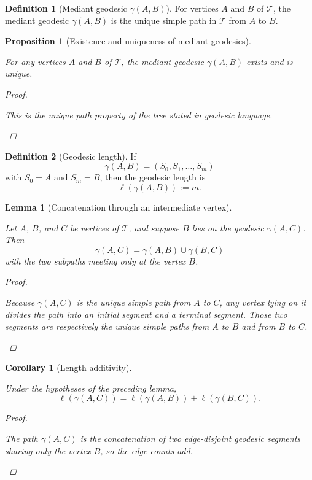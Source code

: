 \documentclass[11pt, letterpaper]{article}
\theoremstyle{definition}
\newtheorem{definition}{Definition}[section]
\theoremstyle{plain}
\newtheorem{lemma}{Lemma}[section]
\newtheorem{proposition}{Proposition}[section]
\newtheorem{corollary}{Corollary}[section]
\begin{document}
\begin{definition}[Mediant geodesic $\gamma(A,B)$]
For vertices $A$ and $B$ of $\mathcal{T}$, the mediant geodesic $\gamma(A,B)$
is the unique simple path in $\mathcal{T}$ from $A$ to $B$.
\end{definition}

\begin{proposition}[Existence and uniqueness of mediant geodesics]
\begin{rsbox}
For any vertices $A$ and $B$ of $\mathcal{T}$, the mediant geodesic
$\gamma(A,B)$ exists and is unique.
\end{rsbox}
\begin{proof}
\begin{rsbox}
This is the unique path property of the tree stated in geodesic language.
\end{rsbox}
\end{proof}

\end{proposition}

\begin{definition}[Geodesic length]
If
\[
\gamma(A,B)=(S_0,S_1,\dots,S_m)
\]
with $S_0=A$ and $S_m=B$, then the geodesic length is
\[
\ell(\gamma(A,B)):=m.
\]
\end{definition}

\begin{lemma}[Concatenation through an intermediate vertex]
\begin{rsbox}
Let $A$, $B$, and $C$ be vertices of $\mathcal{T}$, and suppose $B$ lies on the
geodesic $\gamma(A,C)$.  Then
\[
\gamma(A,C)=\gamma(A,B)\cup\gamma(B,C)
\]
with the two subpaths meeting only at the vertex $B$.
\end{rsbox}
\begin{proof}
\begin{rsbox}
Because $\gamma(A,C)$ is the unique simple path from $A$ to $C$, any vertex
lying on it divides the path into an initial segment and a terminal segment.
Those two segments are respectively the unique simple paths from $A$ to $B$ and
from $B$ to $C$.
\end{rsbox}
\end{proof}

\end{lemma}

\begin{corollary}[Length additivity]
\begin{rsbox}
Under the hypotheses of the preceding lemma,
\[
\ell(\gamma(A,C))=\ell(\gamma(A,B))+\ell(\gamma(B,C)).
\]
\end{rsbox}
\begin{proof}
\begin{rsbox}
The path $\gamma(A,C)$ is the concatenation of two edge-disjoint geodesic
segments sharing only the vertex $B$, so the edge counts add.
\end{rsbox}
\end{proof}

\end{corollary}
\end{document}

